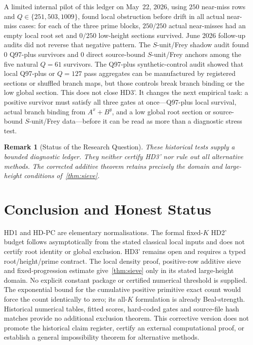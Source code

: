 \documentclass[11pt,a4paper]{article}
\newtheorem{remark}[theorem]{Remark}
\begin{document}
A limited internal pilot of this ledger on May~22, 2026, using $250$
near-miss rows and $Q\in\{251,503,1009\}$, found local obstruction
before drift in all actual near-miss cases: for each of the three prime
blocks, $250/250$ actual near-misses had an empty local root set and
$0/250$ low-height sections survived. June 2026 follow-up audits did
not reverse that negative pattern. The $S$-unit/Frey shadow audit found
$0$ Q97-plus survivors and $0$ direct source-bound $S$-unit/Frey anchors
among the five natural $Q=61$ survivors. The Q97-plus synthetic-control
audit showed that local Q97-plus or $Q=127$ pass aggregates can be
manufactured by registered sections or shuffled branch maps, but those
controls break branch binding or the low global section. This does not
close HD3'. It changes the next empirical task: a positive survivor
must satisfy all three gates at once---Q97-plus local survival, actual
branch binding from $A^x+B^y$, and a low global root section or
source-bound $S$-unit/Frey data---before it can be read as more than a
diagnostic stress test.

\begin{remark}[Status of the Research Question]
These historical tests supply a bounded diagnostic ledger.
They neither certify HD3' nor rule out all alternative methods.
The corrected additive theorem retains precisely the domain and
large-height conditions of~\cref{thm:sieve}.
\end{remark}

\section{Conclusion and Honest Status}

HD1 and HD-PC are elementary normalisations. The formal fixed-$K$
HD2' budget follows asymptotically from the stated classical local
inputs and does not certify root identity or global exclusion.
HD3' remains open and requires a typed root/height/prime contract.
The local density proof, positive-row additive sieve and
fixed-progression estimate give~\cref{thm:sieve} only in its stated
large-height domain. No explicit constant package or certified
numerical threshold is supplied.
The exponential bound for the cumulative positive primitive exact
count would force the count identically to zero; its all-$K$
formulation is already Beal-strength.
Historical numerical tables, fitted scores, hard-coded gates and
source-file hash matches provide no additional exclusion theorem.
This corrective version does not promote the historical claim
register, certify an external computational proof, or establish a
general impossibility theorem for alternative methods.
\end{document}
